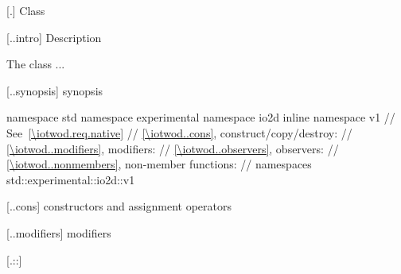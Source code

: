  [\iotwod.] {Class \tcode{}}

 [\iotwod..intro] {\tcode{} Description}

\pnum
\indexlibrary{\idxcode{}}%
The \tcode{} class ...

 [\iotwod..synopsis] {\tcode{} synopsis}

\begin{codeblock}
namespace std { namespace experimental { namespace io2d { inline namespace v1 {
    // See~\ref{\iotwod.req.native}
    // \ref{\iotwod..cons}, construct/copy/destroy:
    // \ref{\iotwod..modifiers}, modifiers:
    // \ref{\iotwod..observers}, observers:
  // \ref{\iotwod..nonmembers}, non-member functions:
} } } } // namespaces std::experimental::io2d::v1
\end{codeblock}

 [\iotwod..cons] {\tcode{} constructors and 
assignment operators}

%
\begin{itemdecl}
\end{itemdecl}
\begin{itemdescr}
	\pnum
	\effects
	
	\pnum
	\postconditions
	
	\pnum
	\complexity
\end{itemdescr}

 [\iotwod..modifiers] {\tcode{} modifiers}

 [\iotwod.::] {\tcode{::}}

\indexlibrary{\idxcode{}!\idxcode{}}%
\indexlibrary{\idxcode{}!\idxcode{}}%
\begin{itemdecl}
\end{itemdecl}
\begin{itemdescr}
	\pnum
	\effects
	
	\pnum
	\postconditions
	
	\pnum
	\complexity
\end{itemdescr}
